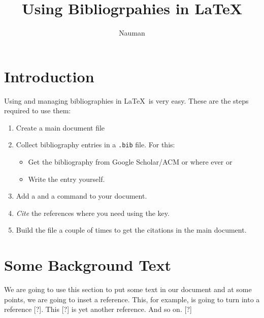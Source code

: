 \documentclass{article}
\begin{document}
\title{Using Bibliogrpahies in \LaTeX}
\author{Nauman}
\maketitle


\section{Introduction} 
Using and managing bibliographies in \LaTeX\ is very easy. These are the steps
required to use them: 

\begin{enumerate}
	\item Create a main document file 
	\item Collect bibliography entries in a \verb|.bib| file. For this: 
	   \begin{itemize}
	     \item Get the bibliography from Google Scholar/ACM or where ever or 
	     \item Write the entry yourself. 
     \end{itemize}
	\item Add a \verb|| and a \verb|| command to
		your document. 
	\item \emph{Cite} the references where you need using the key. 
	\item Build the file a couple of times to get the citations in the main
		document. 
\end{enumerate}

\section{Some Background Text}
We are going to use this section to put some text in our document and at some
points, we are going to inset a reference. This, for example, is going to turn
into a reference [?]. This [?] is yet another reference. And so on. [?]




\end{document}
